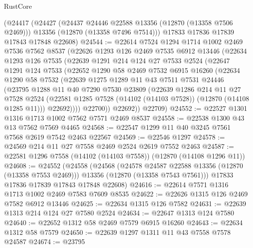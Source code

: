 \begin{lexlean}{RustCore}
\begin{coremodule}
    (@24417
      (@24427
        (@24437 @24446 @22588 @13356 (@12870 (@13358 @7506 @2469)))
        @13356
        (@12870 (@13358 @7496 @7514)))
      @17833
      @17836
      @17839
      @17843
      @17848
      @22608)
@24544 := @22614
    @7524
    @1294
    @1714
    @1002
    @2469
    @7536
    @7562
    @8537
    (@22626
      @1293
      @126
      @2469
      @7535
      @6912
      @13446
      (@22634
        @1293
        @126
        @7535
        (@22639
          @1291
          @214
          @124
          @27
          @7533
          @2524
          (@22647
            @1291
            @124
            @7533
            (@22652
              @1290
              @58
              @2469
              @7532
              @6915
              @16260
              (@22634
                @1290
                @58
                @7532
                (@22639
                  @1275
                  @1289
                  @11
                  @43
                  @7511
                  @7531
                  @24446
                  (@23795
                    @1288
                    @11
                    @40
                    @7290
                    @7530
                    @23809
                    (@22639
                      @1286
                      @214
                      @11
                      @27
                      @7528
                      @2524
                      (@22581 @1285 @7528 (@14102 (@14103 @7528)) (@12870 (@14108 @1285 @11)))
                      @22692))))
              @22700))
          @22692))
      @22709)
@24552 := @22527 @1301 @1316 @1713 @1002 @7562 @7571 @2469 @8537
@24558 := @22538 @1300 @43 @13 @7562 @7569 @4465
@24568 := @22547 @1299 @11 @40 @3245 @7561 @7568 @2619 @7542 @2463 @22567
@24569 := @22546 @1297
@24578 := @24569 @214 @11 @27 @7558 @2469 @2524 @2619 @7552 @2463
@24587 := @22581 @1296 @7558 (@14102 (@14103 @7558)) (@12870 (@14108 @1296 @11))
@24608 := @24552
    (@24558
      (@24568
        (@24578 @24587 @22588 @13356 (@12870 (@13358 @7553 @2469)))
        @13356
        (@12870 (@13358 @7543 @7561)))
      @17833
      @17836
      @17839
      @17843
      @17848
      @22608)
@24616 := @22614 @7571 @1316 @1713 @1002 @2469 @7583 @7609 @8535
@24622 := @22626 @1315 @126 @2469 @7582 @6912 @13446
@24625 := @22634 @1315 @126 @7582
@24631 := @22639 @1313 @214 @124 @27 @7580 @2524
@24634 := @22647 @1313 @124 @7580
@24640 := @22652 @1312 @58 @2469 @7579 @6915 @16260
@24643 := @22634 @1312 @58 @7579
@24650 := @22639 @1297 @1311 @11 @43 @7558 @7578 @24587
@24674 := @23795

\end{coremodule}
\end{lexlean}

